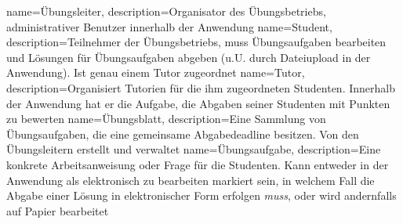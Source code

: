 {
  name=Übungsleiter,
  description={Organisator des Übungsbetriebs, administrativer Benutzer innerhalb der Anwendung}
}
{
  name=Student,
  description={Teilnehmer der Übungsbetriebs, muss Übungsaufgaben bearbeiten und Lösungen für Übungsaufgaben abgeben (u.U. durch Dateiupload in der Anwendung). Ist genau einem Tutor zugeordnet}
}
{
  name=Tutor,
  description={Organisiert Tutorien für die ihm zugeordneten Studenten. Innerhalb der Anwendung hat er die Aufgabe, die Abgaben seiner Studenten mit Punkten zu bewerten}
}
{
  name=Übungsblatt,
  description={Eine Sammlung von Übungsaufgaben, die eine gemeinsame Abgabedeadline besitzen. Von den Übungsleitern erstellt und verwaltet}
}
{
  name=Übungsaufgabe,
  description={Eine konkrete Arbeitsanweisung oder Frage für die Studenten. Kann entweder in der Anwendung als elektronisch zu bearbeiten markiert sein, in welchem Fall die Abgabe einer Lösung in elektronischer Form erfolgen {\em muss}, oder wird andernfalls auf Papier bearbeitet}
}


\renewcommand*{\glossaryname}{\section{\glossarName}}

\glsaddall
\printglossaries

